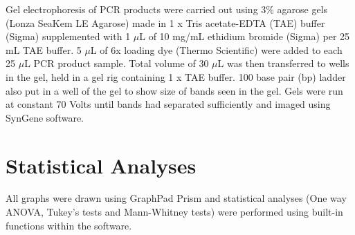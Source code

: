 Gel electrophoresis of PCR products were carried out using 3\% agarose gels (Lonza SeaKem LE Agarose) made in 1 x Tris acetate-EDTA (TAE) buffer (Sigma) supplemented with 1 $\mu$L of 10 mg/mL ethidium bromide (Sigma) per 25 mL TAE buffer.
5 $\mu$L of 6x loading dye (Thermo Scientific) were added to each 25 $\mu$L PCR product sample.
Total volume of 30 $\mu$L was then transferred to wells in the gel, held in a gel rig containing 1 x TAE buffer.
100 base pair (bp) ladder also put in a well of the gel to show size of bands seen in the gel.
Gels were run at constant 70 Volts until bands had separated sufficiently and imaged using SynGene software.

\section{Statistical Analyses}

All graphs were drawn using GraphPad Prism and statistical analyses (One way ANOVA, Tukey's tests and Mann-Whitney tests) were performed using built-in functions within the software.
